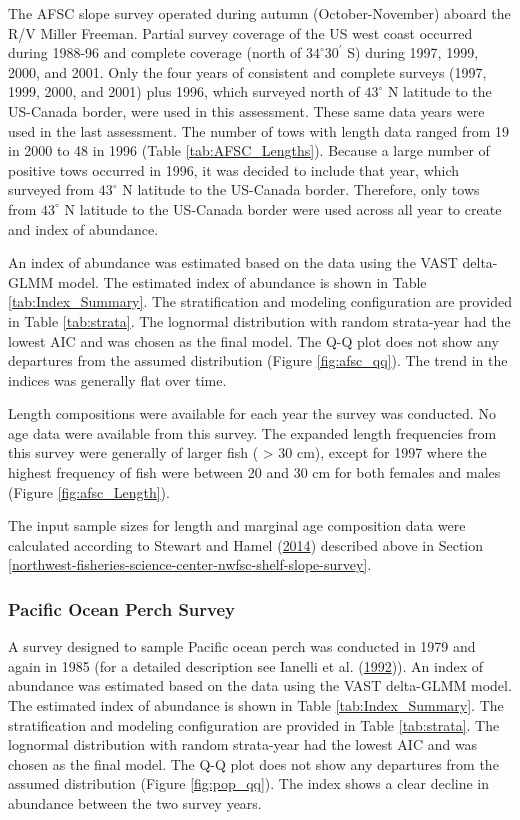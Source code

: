\documentclass[12pt,]{article}
\begin{document}
The AFSC slope survey operated during autumn (October-November) aboard
the R/V Miller Freeman. Partial survey coverage of the US west coast
occurred during 1988-96 and complete coverage (north of
\(34^\circ 30^\prime\) S) during 1997, 1999, 2000, and 2001. Only the
four years of consistent and complete surveys (1997, 1999, 2000, and
2001) plus 1996, which surveyed north of \(43^\circ\) N latitude to the
US-Canada border, were used in this assessment. These same data years
were used in the last assessment. The number of tows with length data
ranged from 19 in 2000 to 48 in 1996 (Table \ref{tab:AFSC_Lengths}).
Because a large number of positive tows occurred in 1996, it was decided
to include that year, which surveyed from \(43^\circ\) N latitude to the
US-Canada border. Therefore, only tows from \(43^\circ\) N latitude to
the US-Canada border were used across all year to create and index of
abundance.

An index of abundance was estimated based on the data using the VAST
delta-GLMM model. The estimated index of abundance is shown in Table
\ref{tab:Index_Summary}. The stratification and modeling configuration
are provided in Table \ref{tab:strata}. The lognormal distribution with
random strata-year had the lowest AIC and was chosen as the final model.
The Q-Q plot does not show any departures from the assumed distribution
(Figure \ref{fig:afsc_qq}). The trend in the indices was generally flat
over time.

Length compositions were available for each year the survey was
conducted. No age data were available from this survey. The expanded
length frequencies from this survey were generally of larger fish (
\textgreater{} 30 cm), except for 1997 where the highest frequency of
fish were between 20 and 30 cm for both females and males (Figure
\ref{fig:afsc_Length}).

The input sample sizes for length and marginal age composition data were
calculated according to Stewart and Hamel
(\protect\hyperlink{ref-stewart_bootstrapping_2014}{2014}) described
above in Section
\ref{northwest-fisheries-science-center-nwfsc-shelf-slope-survey}.

\subsubsection{Pacific Ocean Perch
Survey}\label{pacific-ocean-perch-survey}

A survey designed to sample Pacific ocean perch was conducted in 1979
and again in 1985 (for a detailed description see Ianelli et al.
(\protect\hyperlink{ref-ianelli_status_1992}{1992})). An index of
abundance was estimated based on the data using the VAST delta-GLMM
model. The estimated index of abundance is shown in Table
\ref{tab:Index_Summary}. The stratification and modeling configuration
are provided in Table \ref{tab:strata}. The lognormal distribution with
random strata-year had the lowest AIC and was chosen as the final model.
The Q-Q plot does not show any departures from the assumed distribution
(Figure \ref{fig:pop_qq}). The index shows a clear decline in abundance
between the two survey years.
\end{document}
